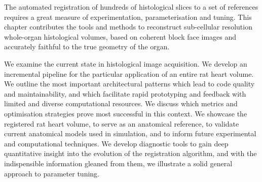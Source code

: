 The automated registration of hundreds of histological slices to a set of references requires a great measure of experimentation, parameterisation and tuning. This chapter contributes the tools and methods to reconstruct sub-cellular resolution whole-organ histological volumes, based on coherent block face images and accurately faithful to the true geometry of the organ.

We examine the current state in histological image acquisition. We develop an incremental pipeline for the particular application of an entire rat heart volume. We outline the most important architectural patterns which lead to code quality and maintainability, and which facilitate rapid prototyping and feedback with limited and diverse computational resources. We discuss which metrics and optimisation strategies prove most successful in this context. We showcase the registered rat heart volume, to serve as an anatomical reference, to validate current anatomical models used in simulation, and to inform future experimental and computational techniques. We develop diagnostic tools to gain deep quantitative insight into the evolution of the registration algorithm, and with the indispensible information gleaned from them, we illustrate a solid general approach to parameter tuning. 
